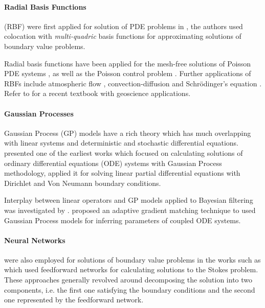 \paragraph{Radial Basis Functions} (RBF) were first applied for solution of PDE problems in 
\citet{KANSA1990147}, the authors used colocation with \emph{multi-quadric} basis functions for 
approximating solutions of boundary value problems.

Radial basis functions have been applied for the mesh-free solutions of Poisson PDE systems 
\citep{AMINATAEI20082887,DUAN200866,DUAN2006394,CNM:CNM419}, as well as the Poisson control problem 
\citep{Pearson2013}. Further applications of RBFs include atmospheric flow 
\citep{Tillenius2015406}, convection-diffusion \citep{Safdari-Vaighani2015} and Schr\"{o}dinger's 
equation \citep{doi:10.1137/120893975}. Refer to \citet{fornberg2015} for a recent textbook with 
geoscience applications.

\paragraph{Gaussian Processes}

Gaussian Process (GP) models \citep{Rasmussen:2005:GPM:1162254} have a rich theory which has much 
overlapping with linear systems and deterministic and stochastic differential equations. 
\citet{Skilling1992} presented one of the earliest works which focused on calculating solutions of 
ordinary differential equations (ODE) systems with Gaussian Process methodology, \citet{Graepel} 
applied it for solving linear partial differential equations with Dirichlet and Von Neumann 
boundary conditions.

Interplay between linear operators and GP models applied to Bayesian filtering was investigated by 
\citet{Sarkka2011}. \citet{pmlr-v31-dondelinger13a} proposed an adaptive gradient matching 
technique to used Gaussian Process models for inferring parameters of coupled ODE systems.

\paragraph{Neural Networks} were also employed for solutions of boundary value problems in the 
works such as \citet{Lagaris,Aarts2001,TSOULOS20092385,Baymani2011} which used feedforward networks 
for calculating solutions to the Stokes problem. These approaches generally revolved around 
decomposing the solution into two components, i.e. the first one satisfying the boundary conditions 
and the second one represented by the feedforward network.


